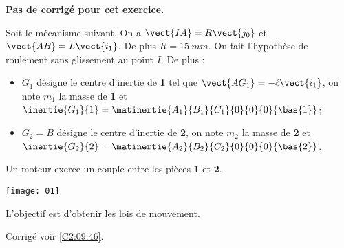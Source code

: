 \normalfalse \difficiletrue \tdifficilefalse
\correctionfalse


\setcounter{question}{0}
\ifcorrection
\else
\textbf{Pas de corrigé pour cet exercice.}
\fi

\ifprof
\else
Soit le mécanisme suivant. On a $\vect{IA}=R\vect{j_0}$ et $\vect{AB}=L\vect{i_1}$. De plus $R=\SI{15}{mm}$.
On fait l'hypothèse de roulement sans glissement au point $I$. De plus :
\begin{itemize}
\item $G_1$ désigne le centre d'inertie de \textbf{1} tel que $\vect{AG_1}=-\ell\vect{i_1}$, on note $m_1$ la masse de \textbf{1} et $\inertie{G_1}{1}=\matinertie{A_1}{B_1}{C_1}{0}{0}{0}{\bas{1}}$; 
\item $G_2=B$ désigne le centre d'inertie de \textbf{2}, on note $m_2$ la masse de \textbf{2} et $\inertie{G_2}{2}=\matinertie{A_2}{B_2}{C_2}{0}{0}{0}{\bas{2}}$.
\end{itemize}
Un moteur exerce un couple entre les pièces \textbf{1} et \textbf{2}. 
\begin{center}
\texttt{[image: 01]}
\end{center}
\fi

L'objectif est d'obtenir les lois de mouvement. 

\ifprof
\else
\fi

\ifprof
\else
\fi


\ifprof
\else
\begin{flushright}
\footnotesize{Corrigé  voir \ref{C2:09:46}.}
\end{flushright}%
\fi
